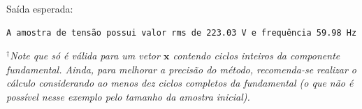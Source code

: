 Saída esperada:
\begin{verbatim}
A amostra de tensão possui valor rms de 223.03 V e frequência 59.98 Hz
\end{verbatim}

$^\dagger$\emph{Note que  só é válida para um vetor $\mathbf{x}$ contendo ciclos inteiros da componente fundamental.
Ainda, para melhorar a precisão do método, recomenda-se realizar o cálculo considerando ao menos dez ciclos completos da fundamental
    (o que não é possível nesse exemplo pelo tamanho da amostra inicial).}


